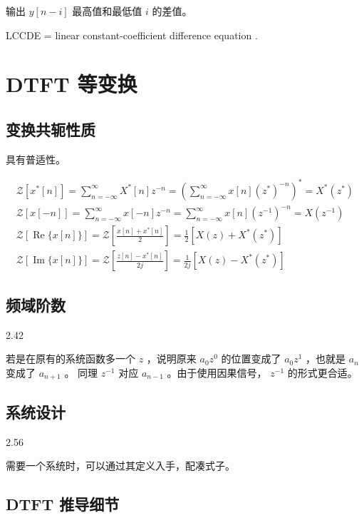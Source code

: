 \documentclass[cn,11pt,chinese,black,simple]{elegantbook}
\begin{document}
输出 \(y[n-i]\) 最高值和最低值 \(i\) 的差值。

LCCDE = linear constant-coefficient difference equation .



\chapter{DTFT 等变换}

\section{变换共轭性质}

具有普适性。

\[
\begin{array}{c}
\mathcal{Z}\left[x^{*}[n]\right]=\sum_{n=-\infty}^{\infty} X^{*}[n] z^{-n}=\left(\sum_{n=-\infty}^{\infty} x[n]\left(z^{*}\right)^{-n}\right)^{*}=X^{*}\left(z^{*}\right) \\
\mathcal{Z}[x[-n]]=\sum_{n=-\infty}^{\infty} x[-n] z^{-n}=\sum_{n=-\infty}^{\infty} x[n]\left(z^{-1}\right)^{-n}=X\left(z^{-1}\right) \\
\mathcal{Z}[\operatorname{Re}\{x[n]\}]=\mathcal{Z}\left[\frac{x[n]+x^{*}[n]}{2}\right]=\frac{1}{2}\left[X(z)+X^{*}\left(z^{*}\right)\right] \\
\mathcal{Z}[\operatorname{Im}\{x[n]\}]=\mathcal{Z}\left[\frac{z[n]-x^{*}[n]}{2 j}\right]=\frac{1}{2 j}\left[X(z)-X^{*}\left(z^{*}\right)\right]
\end{array}
\]

\section{频域阶数}

2.42

若是在原有的系统函数多一个 \(z\) ，说明原来 \(a_0 z^0\) 的位置变成了 \(a_0 z^1\) ，也就是 \(a_n\) 变成了 \(a_{n+1}\) 。 同理 \(z^{-1}\) 对应 \(a_{n-1}\) 。由于使用因果信号， \(z^{-1}\) 的形式更合适。

\section{系统设计}

2.56 

需要一个系统时，可以通过其定义入手，配凑式子。 

\section{DTFT 推导细节}
\end{document}
